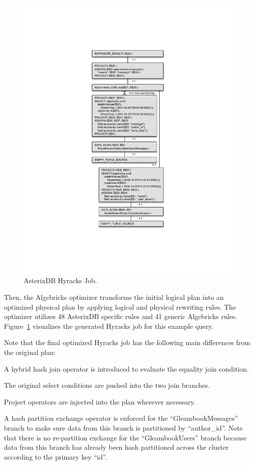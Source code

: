 \begin{figure}[tb]
\vspace{-.8ex}
\centering
\includegraphics[width=0.5\columnwidth]{images/asterix_hyracks_job_renamed}
\vspace{-1ex}
\caption{AsterixDB Hyracks Job.}
\vspace{-.8ex}
\label{fig:asterix_hyracks_job}
\end{figure}

Then, the Algebricks optimizer transforms the initial logical plan into an optimized physical plan by applying logical and physical rewriting rules.
The optimizer utilizes 48 AsterixDB specific rules and 41 generic Algebricks rules. 
Figure~\ref{fig:asterix_hyracks_job} visualizes the generated Hyracks job for this example query.

Note that the final optimized Hyracks job has the following main differences from the original plan:

\begin{list}{}{\leftmargin=1em}\itemsep 0pt \parskip 0pt

\item A hybrid hash join operator is introduced to evaluate
the equality join condition.

\item The original select conditions are pushed into the two join branches.

\item Project operators are injected into the plan wherever necessary.

\item A hash partition exchange operator is enforced for the ``GleambookMessages'' branch to make sure data from this branch is partitioned by ``author\_id''.  Note that there is no re-partition exchange for the ``GleambookUsers'' branch because data from this branch has already been hash partitioned across the cluster according to the primary key ``id''.

\end{list}



